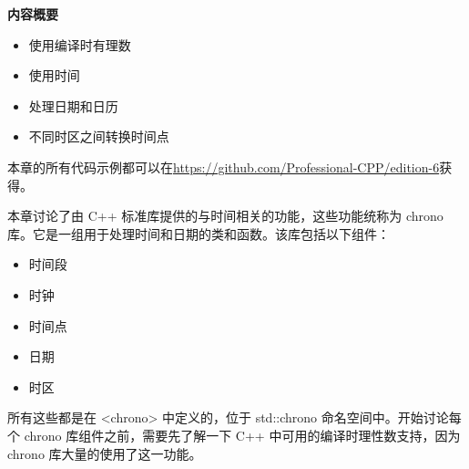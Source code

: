 \noindent
\textbf{内容概要}

\begin{itemize}
\item
使用编译时有理数

\item
使用时间

\item
处理日期和日历

\item
不同时区之间转换时间点
\end{itemize}

本章的所有代码示例都可以在\url{https://github.com/Professional-CPP/edition-6}获得。

本章讨论了由 C++ 标准库提供的与时间相关的功能，这些功能统称为 chrono 库。它是一组用于处理时间和日期的类和函数。该库包括以下组件：

\begin{itemize}
\item
时间段

\item
时钟

\item
时间点

\item
日期

\item
时区
\end{itemize}

所有这些都是在 <chrono> 中定义的，位于 std::chrono 命名空间中。开始讨论每个 chrono 库组件之前，需要先了解一下 C++ 中可用的编译时理性数支持，因为 chrono 库大量的使用了这一功能。

